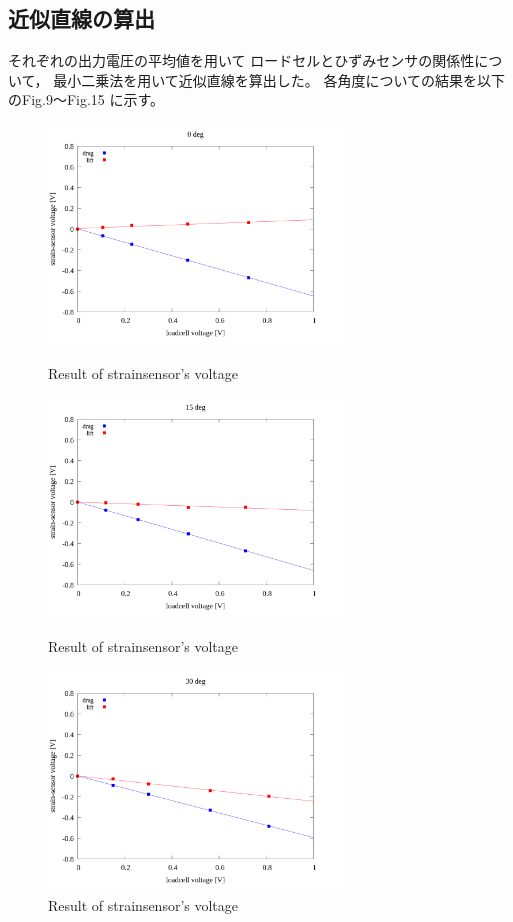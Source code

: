 \documentclass[twocolumn,a4j]{jsarticle}
\begin{document}
\subsection{近似直線の算出}
それぞれの出力電圧の平均値を用いて
ロードセルとひずみセンサの関係性について，
最小二乗法を用いて近似直線を算出した。
各角度についての結果を以下のFig.9～Fig.15 に示す。
\begin{figure}[htbp]
    \footnotesize
    \begin{center}
        \includegraphics[width=78mm]{../images/linear/0_linear.png}
        \caption{Result of strainsensor's voltage}
        \includegraphics[width=78mm]{../images/linear/15_linear.png}
        \caption{Result of strainsensor's voltage}
        \includegraphics[width=78mm]{../images/linear/30_linear.png}
        \caption{Result of strainsensor's voltage}
    \end{center}
\end{figure}
\end{document}
